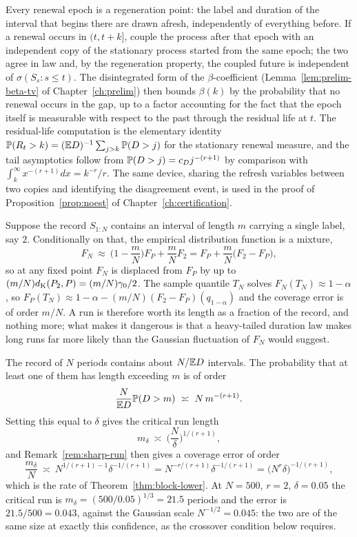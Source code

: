 \documentclass[../../../main.tex]{subfiles}
\begin{document}
\begin{route}
Every renewal epoch is a regeneration point: the label and duration of the interval that begins there are drawn afresh, independently of everything before. If a renewal occurs in $(t,t+k]$, couple the process after that epoch with an independent copy of the stationary process started from the same epoch; the two agree in law and, by the regeneration property, the coupled future is independent of $\sigma(S_s:s\le t)$. The disintegrated form of the $\beta$-coefficient (Lemma~\ref{lem:prelim-beta-tv} of Chapter~\ref{ch:prelim}) then bounds $\beta(k)$ by the probability that no renewal occurs in the gap, up to a factor accounting for the fact that the epoch itself is measurable with respect to the past through the residual life at $t$. The residual-life computation is the elementary identity $\mathbb{P}(R_t>k)=(\mathbb{E} D)^{-1}\sum_{j>k}\mathbb{P}(D>j)$ for the stationary renewal measure, and the tail asymptotics follow from $\mathbb{P}(D>j)=c_Dj^{-(r+1)}$ by comparison with $\int_k^\infty x^{-(r+1)}dx=k^{-r}/r$. The same device, sharing the refresh variables between two copies and identifying the disagreement event, is used in the proof of Proposition~\ref{prop:noest} of Chapter~\ref{ch:certification}.
\end{route}

\begin{remark}\label{rem:sharp-run}
Suppose the record $S_{1:N}$ contains an interval of length $m$ carrying a single label, say $2$. Conditionally on that, the empirical distribution function is a mixture,
\[
F_N\ \approx\ \Big(1-\frac mN\Big)F_P+\frac mN F_2 = F_P+\frac mN\big(F_2-F_P\big),
\]
so at any fixed point $F_N$ is displaced from $F_P$ by up to $(m/N)d_{\mathrm{K}}(P_2,P)=(m/N)\gamma_0/2$. The sample quantile $T_N$ solves $F_N(T_N)\approx1-\alpha$, so $F_P(T_N)\approx1-\alpha-(m/N)(F_2-F_P)(q_{1-\alpha})$ and the coverage error is of order $m/N$. A run is therefore worth its length as a fraction of the record, and nothing more; what makes it dangerous is that a heavy-tailed duration law makes long runs far more likely than the Gaussian fluctuation of $F_N$ would suggest.
\end{remark}

\begin{remark}\label{rem:sharp-tradeoff}
The record of $N$ periods contains about $N/\mathbb{E} D$ intervals. The probability that at least one of them has length exceeding $m$ is of order
\[
\frac N{\E D}\Prob(D>m)\ \asymp\ N\,m^{-(r+1)} .
\]
Setting this equal to $\delta$ gives the critical run length
\[
m_\delta\ \asymp\ \Big(\frac N\delta\Big)^{1/(r+1)} ,
\]
and Remark~\ref{rem:sharp-run} then gives a coverage error of order
\[
\frac{m_\delta}N\ \asymp\ N^{1/(r+1)-1}\delta^{-1/(r+1)}=N^{-r/(r+1)}\delta^{-1/(r+1)}=\big(N^r\delta\big)^{-1/(r+1)} ,
\]
which is the rate of Theorem~\ref{thm:block-lower}. At $N=500$, $r=2$, $\delta=0.05$ the critical run is $m_\delta=(500/0.05)^{1/3}=21.5$ periods and the error is $21.5/500=0.043$, against the Gaussian scale $N^{-1/2}=0.045$: the two are of the same size at exactly this confidence, as the crossover condition below requires.
\end{remark}
\end{document}
